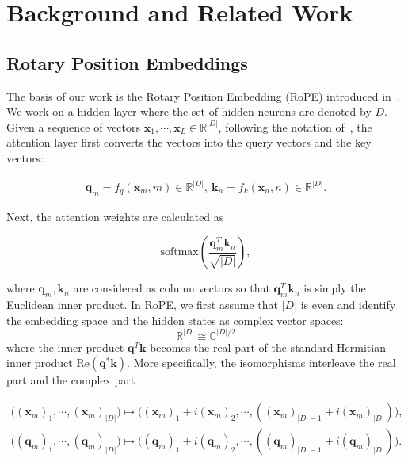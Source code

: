 \section{Background and Related Work}

\subsection{Rotary Position Embeddings}\label{sec:rope}

The basis of our work is the Rotary Position Embedding (RoPE) introduced in~\citep{su2022roformer}. We work on a hidden layer where the set of hidden neurons are denoted by $D$. Given a sequence of vectors ${\bm{x}}_1, \cdots, {\bm{x}}_L\in \mathbb{R}^{|D|}$, following the notation of~\citep{su2022roformer}, the attention layer first converts the vectors into the query vectors and the key vectors:

\begin{align}
{\bm{q}}_m = f_q({\bm{x}}_m, m) \in \mathbb{R}^{|D|}, ~ {\bm{k}}_n = f_k({\bm{x}}_n, n) \in \mathbb{R}^{|D|}.
\end{align}

Next, the attention weights are calculated as

\begin{equation}\label{eq:attention}
\text{softmax}(\dfrac{{\bm{q}}_m^T{\bm{k}}_n}{\sqrt{|D|}}),
\end{equation}

where ${\bm{q}}_m, {\bm{k}}_n$ are considered as column vectors so that ${\bm{q}}_m^T{\bm{k}}_n$ is simply the Euclidean inner product. In RoPE, we first assume that $|D|$ is even and identify the embedding space and the hidden states as complex vector spaces:
\[\mathbb{R}^{|D|}\cong \mathbb{C}^{|D|/2}\]
where the inner product ${\bm{q}}^T{\bm{k}}$ becomes the real part of the standard Hermitian inner product $\text{Re}({\bm{q}}^*{\bm{k}})$. More specifically, the isomorphisms interleave the real part and the complex part

\begin{align}
\big(({\bm{x}}_m)_1, \cdots, ({\bm{x}}_m)_{|D|} \big) \mapsto \big(({\bm{x}}_m)_1 + i({\bm{x}}_m)_2, \cdots, (({\bm{x}}_m)_{|D|-1} + i({\bm{x}}_m)_{|D|})\big), \\
\big((\textbf{q}_m)_1, \cdots, (\textbf{q}_m)_{|D|} \big) \mapsto \big((\textbf{q}_m)_1 + i(\textbf{q}_m)_2, \cdots, ((\textbf{q}_m)_{|D|-1} + i(\textbf{q}_m)_{|D|})\big).
\end{align}

